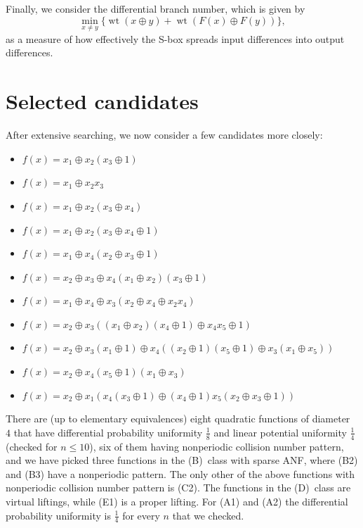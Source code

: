 \documentclass[11pt,english,a4paper]{amsart}
\theoremstyle{plain}
\theoremstyle{definition}
\theoremstyle{remark}
\begin{document}
	Finally, we consider the differential branch number, which is given by
	\[
	\min_{x\neq y}\{ \operatorname{wt}(x \oplus y) + \operatorname{wt}(F(x) \oplus F(y)) \},
	\]
	as a measure of how effectively the S-box spreads input differences into output differences.
    
	\section{Selected candidates}\label{sec-selection}
	
	After extensive searching, we now consider a few candidates more closely:
	\begin{itemize}
		\item[(A1)] $f(x)=x_1\oplus x_2(x_3\oplus 1)$
		\item[(A2)] $f(x)=x_1\oplus x_2x_3$
		\item[(B1)] $f(x)=x_1\oplus x_2(x_3\oplus x_4)$
		\item[(B2)] $f(x)=x_1\oplus x_2(x_3\oplus x_4\oplus 1)$
		\item[(B3)] $f(x)=x_1\oplus x_4(x_2\oplus x_3\oplus 1)$
		\item[(C1)] $f(x)=x_2\oplus x_3\oplus x_4(x_1\oplus x_2)(x_3\oplus 1)$
		\item[(C2)] $f(x)=x_1\oplus x_4\oplus x_3(x_2\oplus x_4\oplus x_2x_4)$
		\item[(D1)] $f(x)=x_2 \oplus x_3 ((x_1 \oplus x_2) (x_4 \oplus 1) \oplus x_4 x_5 \oplus 1)$
		\item[(D2)] $f(x)=x_2 \oplus x_3 (x_1 \oplus 1) \oplus x_4 ((x_2 \oplus 1) (x_5 \oplus 1) \oplus x_3 (x_1 \oplus x_5))$
		\item[(D3)] $f(x)=x_2 \oplus x_4 (x_5 \oplus 1) (x_1 \oplus x_3)$
		\item[(E1)] $f(x)=x_2 \oplus x_1 (x_4 (x_3 \oplus 1) \oplus (x_4 \oplus 1) x_5 (x_2 \oplus x_3 \oplus 1))$
	\end{itemize}
	
	\medskip
	
	
	There are (up to elementary equivalences) eight quadratic functions of diameter~$4$ that have differential probability uniformity $\frac{1}{8}$ and linear potential uniformity $\frac{1}{4}$ (checked for $n\leq 10$), six of them having nonperiodic collision number pattern, and we have picked three functions in the (B)~class with sparse ANF, where (B2) and (B3) have a nonperiodic pattern. The only other of the above functions with nonperiodic collision number pattern is (C2). The functions in the (D)~class are virtual liftings, while (E1) is a proper lifting.
	For (A1) and (A2) the differential probability uniformity is $\frac{1}{4}$ for every $n$ that we checked. %
	
\end{document}
